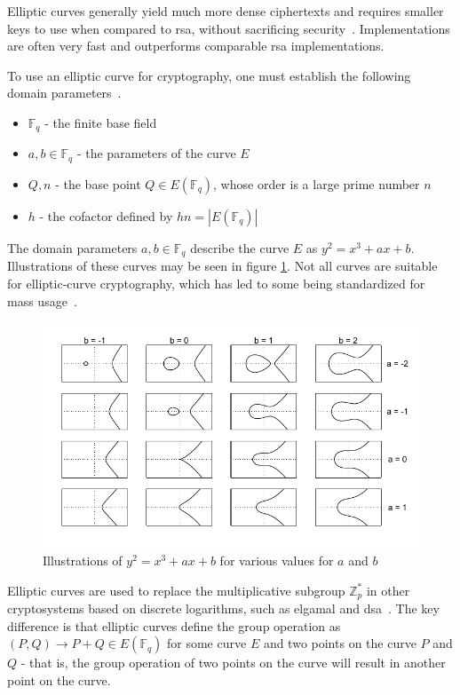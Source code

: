 Elliptic curves generally yield much more dense ciphertexts and requires smaller keys to use when compared to \gls{rsa}, without sacrificing security~\cite{delfs2007}. Implementations are often very fast and outperforms comparable \gls{rsa} implementations.

To use an elliptic curve for cryptography, one must establish the following domain parameters~\cite{delfs2007}.

\begin{itemize}
    \item $\mathbb{F}_q$ - the finite base field
    \item $a,b\in\mathbb{F}_q$ - the parameters of the curve $E$
    \item $Q,n$ - the base point $Q\in E(\mathbb{F}_q)$, whose order is a large prime number $n$
    \item $h$ - the cofactor defined by $hn=|E(\mathbb{F}_q)|$
\end{itemize}

\noindent The domain parameters $a,b\in\mathbb{F}_q$ describe the curve $E$ as $y^2=x^3+ax+b$. Illustrations of these curves may be seen in figure \ref{figure:background:elliptic-curves}. Not all curves are suitable for elliptic-curve cryptography, which has led to some being standardized for mass usage~\cite{nist2018}.

\begin{figure}[t]
    \centering
    \includegraphics{chapters/background/figures/elliptic-curves.pdf}
    \caption{Illustrations of $y^2=x^3+ax+b$ for various values for $a$ and $b$}
    \label{figure:background:elliptic-curves}
\end{figure}

Elliptic curves are used to replace the multiplicative subgroup $\mathbb{Z}_p^*$ in other cryptosystems based on discrete logarithms, such as \gls{elgamal} and \gls{dsa}~\cite{delfs2007}. The key difference is that elliptic curves define the group operation as $(P, Q)\to P+Q\in E(\mathbb{F}_q)$ for some curve $E$ and two points on the curve $P$ and $Q$ - that is, the group operation of two points on the curve will result in another point on the curve.

